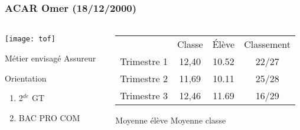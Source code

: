 \documentclass{beamer}
\begin{document}
\begin{frame}
\frametitle{ACAR Omer (18/12/2000)}  
\framesubtitle{ }	


\begin{columns}[onlytextwidth]



\begin{column}{0.3\textwidth}
	\vspace*{.5cm}
	\begin{center}
			\texttt{[image: tof]}
	\end{center}

	
	\begin{block}{Métier envisagé}
		Assureur
	\end{block}
	
	\begin{alertblock}{Orientation}
		\begin{enumerate}
			\item 2$^{de}$ GT
			\item BAC PRO COM
		\end{enumerate}
	\end{alertblock}
	
	
\end{column}	

\begin{column}{0.70\textwidth}
	
		\begin{center}
		
		\vspace*{-.7cm}	

		{\small \begin{tabular}{cccc}
			& Classe                       & \'Elève                      & Classement                   \\
			{\color[HTML]{00009B} Trimestre 1} & {\color[HTML]{00009B} 12,40} & {\color[HTML]{00009B} 10.52} & {\color[HTML]{00009B} 22/27} \\ \hline
			{\color[HTML]{FE0000} Trimestre 2} & {\color[HTML]{FE0000} 11,69} & {\color[HTML]{FE0000} 10.11} & {\color[HTML]{FE0000} 25/28} \\ \hline
			{\color[HTML]{34FF34} Trimestre 3} & {\color[HTML]{34FF34} 12,46} & {\color[HTML]{34FF34} 11.69} & {\color[HTML]{34FF34} 16/29}
		\end{tabular}}
		
	

{\color{blue} Moyenne élève}
{\color{red} Moyenne classe}

\vspace*{-0.8cm}




\end{center}
\end{column}
\end{columns}
\end{frame}
\end{document}
